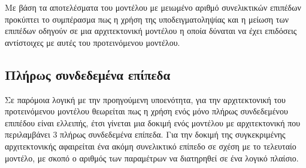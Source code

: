 
Με βάση τα αποτελέσματα του μοντέλου με μειωμένο αριθμό συνελικτικών επιπέδων προκύπτει το συμπέρασμα πως η χρήση της υποδειγματοληψίας και η μείωση των επιπέδων οδηγούν σε μια αρχιτεκτονική μοντέλου η οποία δύναται να έχει επιδόσεις αντίστοιχες με αυτές του προτεινόμενου μοντέλου.\\

\subsection{Πλήρως συνδεδεμένα επίπεδα}
Σε παρόμοια λογική με την προηγούμενη υποενότητα, για την αρχιτεκτονική του προτεινόμενου μοντέλου θεωρείται πως η χρήση ενός μόνο πλήρως συνδεδεμένου επιπέδου είναι ελλειπής, έτσι γίνεται μια δοκιμή ενός μοντέλου με αρχιτεκτονική που περιλαμβάνει 3 πλήρως συνδεδεμένα επίπεδα. Για την δοκιμή της συγκεκριμένης αρχιτεκτονικής αφαιρείται ένα ακόμη συνελικτικό επίπεδο σε σχέση με το τελευταίο μοντέλο, με σκοπό ο αριθμός των παραμέτρων να διατηρηθεί σε ένα λογικό πλαίσιο.


